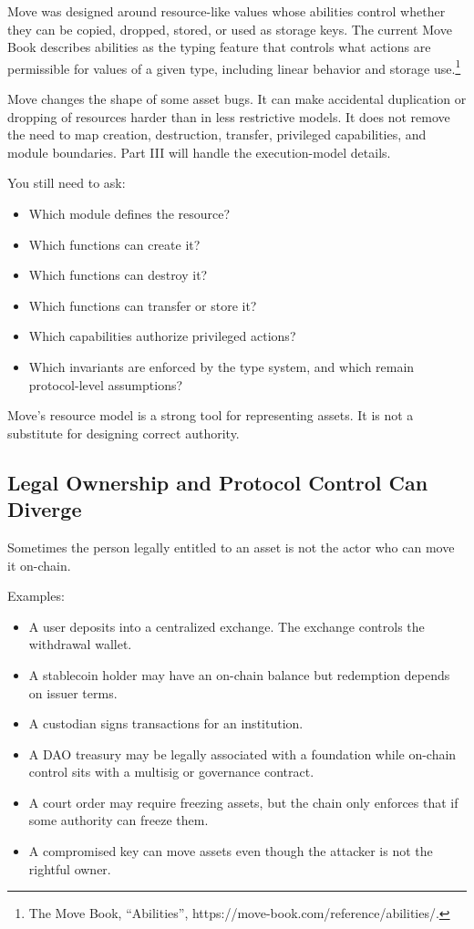Move was designed around resource-like values whose abilities control
whether they can be copied, dropped, stored, or used as storage keys.
The current Move Book describes abilities as the typing feature that
controls what actions are permissible for values of a given type,
including linear behavior and storage use.\footnote{The Move Book,
  ``Abilities'', https://move-book.com/reference/abilities/.}

Move changes the shape of some asset bugs. It can make accidental
duplication or dropping of resources harder than in less restrictive
models. It does not remove the need to map creation, destruction,
transfer, privileged capabilities, and module boundaries. Part III will
handle the execution-model details.

You still need to ask:

\begin{itemize}
\tightlist
\item
  Which module defines the resource?
\item
  Which functions can create it?
\item
  Which functions can destroy it?
\item
  Which functions can transfer or store it?
\item
  Which capabilities authorize privileged actions?
\item
  Which invariants are enforced by the type system, and which remain
  protocol-level assumptions?
\end{itemize}

Move's resource model is a strong tool for representing assets. It is
not a substitute for designing correct authority.

\subsection{Legal Ownership and Protocol Control Can Diverge}

Sometimes the person legally entitled to an asset is not the actor who
can move it on-chain.

Examples:

\begin{itemize}
\tightlist
\item
  A user deposits into a centralized exchange. The exchange controls the
  withdrawal wallet.
\item
  A stablecoin holder may have an on-chain balance but redemption
  depends on issuer terms.
\item
  A custodian signs transactions for an institution.
\item
  A DAO treasury may be legally associated with a foundation while
  on-chain control sits with a multisig or governance contract.
\item
  A court order may require freezing assets, but the chain only enforces
  that if some authority can freeze them.
\item
  A compromised key can move assets even though the attacker is not the
  rightful owner.
\end{itemize}

